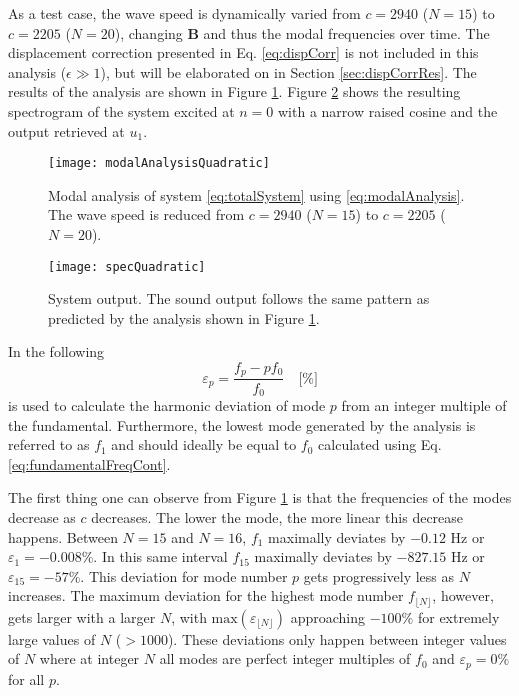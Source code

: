 As a test case, the wave speed is dynamically varied from $c = 2940$ ($N = 15$) to $c = 2205$ ($N = 20$), changing $\mathbf{B}$ and thus the modal frequencies over time. The displacement correction presented in Eq. \eqref{eq:dispCorr} is not included in this analysis ($\epsilon \gg 1$), but will be elaborated on in Section \ref{sec:dispCorrRes}. The results of the analysis are shown in Figure \ref{fig:modalAnalysis}. Figure \ref{fig:spectrogram} shows the resulting spectrogram of the system excited at $n=0$ with a narrow raised cosine and the output retrieved at $u_1$.

\begin{figure}[ht]
    \centering
\texttt{[image: modalAnalysisQuadratic]}
\caption{\label{fig:modalAnalysis}{Modal analysis of system \eqref{eq:totalSystem} using \eqref{eq:modalAnalysis}. The wave speed is reduced from $c = 2940$ ($N = 15$) to $c = 2205$ ($N = 20$).}}
\end{figure} 
\begin{figure}[ht]
    \centering
\texttt{[image: specQuadratic]}
\caption{\label{fig:spectrogram}{System output. The sound output follows the same pattern as predicted by the analysis shown in Figure \ref{fig:modalAnalysis}.}}
\end{figure} 

In the following 
\begin{equation}
    \varepsilon_p = \frac{f_p - pf_0}{f_0}\quad \text{[\%]}
\end{equation}
is used to calculate the harmonic deviation of mode $p$ from an integer multiple of the fundamental. Furthermore, the lowest mode generated by the analysis is referred to as $f_1$ and should ideally be equal to $f_0$ calculated using Eq. \eqref{eq:fundamentalFreqCont}.

The first thing one can observe from Figure \ref{fig:modalAnalysis} is that the frequencies of the modes decrease as $c$ decreases. The lower the mode, the more linear this decrease happens. Between $N = 15$ and $N = 16$, $f_1$ maximally deviates by $-0.12$ Hz or $\varepsilon_1 = -0.008\%$. In this same interval $f_{15}$ maximally deviates by $-827.15$ Hz or $\varepsilon_{15} = -57\%$. This deviation for mode number $p$ gets progressively less as $N$ increases. The maximum deviation for the highest mode number $f_{\lfloor N\rfloor}$, however, gets larger with a larger $N$, with $\text{max}(\varepsilon_{\lfloor N \rfloor})$ approaching $-100\%$ for extremely large values of $N$ ($>1000$). These deviations only happen between integer values of $N$ where at integer $N$ all modes are perfect integer multiples of $f_0$ and $\varepsilon_p = 0 \%$ for all $p$.

